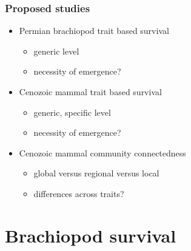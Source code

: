 \documentclass{beamer}
\begin{document}
\begin{frame}
  \frametitle{Proposed studies}

  \begin{itemize}
    \item Permian brachiopod trait based survival %
      \begin{itemize}
        \item generic level 
        \item necessity of emergence?
      \end{itemize}
    \item Cenozoic mammal trait based survival %
      \begin{itemize}
        \item generic, specific level 
        \item necessity of emergence?
      \end{itemize}
    \item Cenozoic mammal community connectedness %
      \begin{itemize}
        \item global versus regional versus local
        \item differences across traits?
      \end{itemize}
  \end{itemize}
\end{frame}


\section{Brachiopod survival}
\end{document}
